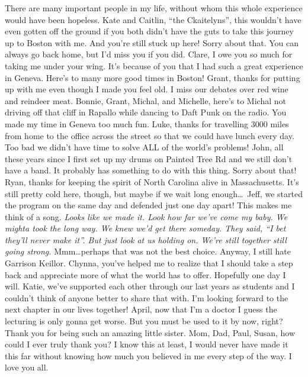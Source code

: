 There are many important people in my life, without whom this whole experience would have been hopeless.
Kate and Caitlin, ``the Ckaitelyns'', this wouldn't have even gotten off the ground  if you both didn't have the guts to take this journey up to Boston with me.  And you're still stuck up here!  Sorry about that. You can always go back home, but I'd miss you if you did. 
Clare, I owe you so much for taking me under your wing. It's because of you that I had such a great experience in Geneva. Here's to many more good times in Boston!
Grant, thanks for putting up with me even though I made you feel old. I miss our debates over red wine and reindeer meat.
Bonnie, Grant, Michal, and Michelle, here's to Michal not driving off that cliff in Rapallo while dancing to Daft Punk on the radio. You made my time in Geneva too much fun.
Luke, thanks for travelling 3000 miles from home to the office across the street so that we could have lunch every day. Too bad we didn't have time to solve ALL of the world's problems!
John, all these years since I first set up my drums on Painted Tree Rd and we still don't have a band. It probably has something to do with this thing. Sorry about that!
Ryan, thanks for keeping the spirit of North Carolina alive in Massachusetts. It's still pretty cold here, though, but maybe
if we wait long enough\dots~Jeff, we started the program on the same day and defended just one day apart! This makes me think of a song. \emph{Looks like we made it. Look how far we've come my baby. We mighta took the long way. We knew we'd get there someday. They said, ``I bet they'll never make it''. But just look at us holding on. We're still together still going strong.} Mmm\dots perhaps that was not the best choice.  Anyway, I still hate Garrison Keillor.
Chynna, you've helped me to realize that I should take a step back and appreciate more of what the world has to offer.
Hopefully one day I will.
Katie, we've supported each other through our last years as students and I couldn't think of anyone better to share that
with. I'm looking forward to the next chapter in our lives together!
April, now that I'm a doctor I guess the lecturing is only gonna get worse. But you must be used to it by now, right?
Thank you for being such an amazing little sister.
Mom, Dad, Paul, Susan, how could I ever truly thank you? I know this at least, I would never have made it this far without knowing how much you believed in me every step of the way.  I love you all.
